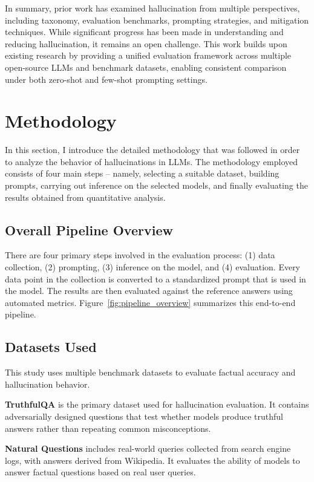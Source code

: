 \documentclass[sigconf,nonacm]{acmart}
\begin{document}
In summary, prior work has examined hallucination from multiple perspectives, including taxonomy, evaluation benchmarks, prompting strategies, and mitigation techniques. While significant progress has been made in understanding and reducing hallucination, it remains an open challenge. This work builds upon existing research by providing a unified evaluation framework across multiple open-source LLMs and benchmark datasets, enabling consistent comparison under both zero-shot and few-shot prompting settings.


\section{Methodology }

In this section, I introduce the detailed methodology that was followed in order to analyze the behavior of hallucinations in LLMs. The methodology employed consists of four main steps – namely, selecting a suitable dataset, building prompts, carrying out inference on the selected models, and finally evaluating the results obtained from quantitative analysis.


\subsection{Overall Pipeline Overview}

There are four primary steps involved in the evaluation process: (1) data collection, (2) prompting, (3) inference on the model, and (4) evaluation. Every data point in the collection is converted to a standardized prompt that is used in the model. The results are then evaluated against the reference answers using automated metrics. Figure~\ref{fig:pipeline_overview} summarizes this end-to-end pipeline.

\subsection{Datasets Used}

This study uses multiple benchmark datasets to evaluate factual accuracy and hallucination behavior.

\textbf{TruthfulQA} is the primary dataset used for hallucination evaluation. It contains adversarially designed questions that test whether models produce truthful answers rather than repeating common misconceptions.

\textbf{Natural Questions} includes real-world queries collected from search engine logs, with answers derived from Wikipedia. It evaluates the ability of models to answer factual questions based on real user queries.
\end{document}
